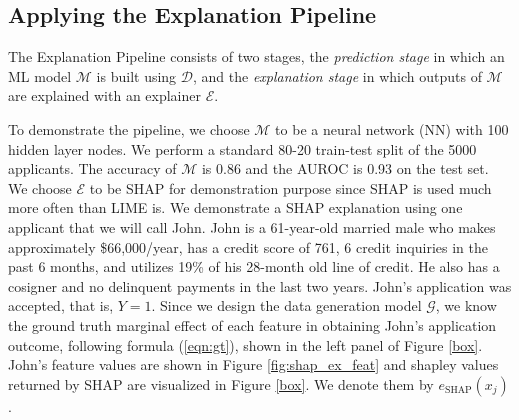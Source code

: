 \documentclass[12pt]{article}  %
\begin{document}
\subsection{Applying the Explanation Pipeline}
\label{sec:applying_to_simulated}
The Explanation Pipeline consists of two stages, the \emph{prediction stage} in which an ML model $\mathcal{M}$ is built using $\mathcal{D}$, and the \emph{explanation stage} in which outputs of $\mathcal{M}$ are explained with an explainer $\mathcal{E}$. 

To demonstrate the pipeline, we choose $\mathcal{M}$ to be a neural network (NN) with 100 hidden layer nodes. We perform a standard 80-20 train-test split of the 5000 applicants. The accuracy of $\mathcal{M}$ is 0.86 and the AUROC is 0.93 on the test set. We choose $\mathcal{E}$ to be SHAP for demonstration purpose since SHAP is used much more often than LIME is. %
We demonstrate a SHAP explanation using one applicant that we will call John. John is a 61-year-old married male who makes approximately \$66,000/year, has a credit score of 761, 6 credit inquiries in the past 6 months, and utilizes 19\% of his 28-month old line of credit. He also has a cosigner and no delinquent payments in the last two years. John's application was accepted, that is, $Y = 1$. Since we design the data generation model $\mathcal{G}$, we know the ground truth marginal effect of each feature in obtaining John's application outcome, following formula (\ref{eqn:gt}), shown in the left panel of Figure \ref{box}. John's feature values are shown in Figure \ref{fig:shap_ex_feat} and shapley values returned by SHAP  are visualized in Figure \ref{box}. We denote them by $e_\text{SHAP}(x_j)$. %
\end{document}
